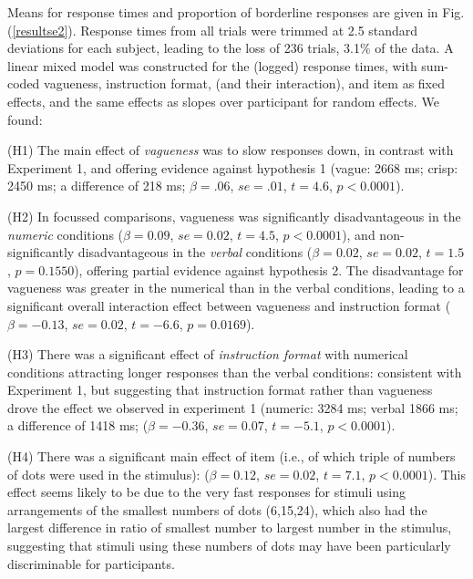 \documentclass[%
man,		%
floatsintext,%
apacite%
]{apa6}
\begin{document}
Means for response times and proportion of borderline responses are given in Fig. (\ref{resultse2}). 
Response times from all trials were trimmed at 2.5 standard deviations for each subject, leading to the loss of 236 trials, 3.1\% of the data. 
A linear mixed model was constructed for the (logged) response times, 
with sum-coded vagueness, instruction format, (and their interaction), and item as fixed effects, and the same effects as slopes over participant for random effects. We found:
{\small
\begin{APAenumerate}
	\item [(H1)] The main effect of \emph{vagueness} was to slow responses down, in contrast with Experiment 1, and offering evidence against hypothesis 1 (vague: 2668 ms; crisp: 2450 ms; a difference of 218 ms; $\beta=.06$, $se=.01$, $t=4.6$, $p<0.0001$). 
	\item [(H2)] In focussed comparisons, vagueness was significantly disadvantageous in the \emph{numeric} conditions ($\beta=0.09$, $se=0.02$, $t=4.5$, $p<0.0001$), and non-significantly disadvantageous in the \emph{verbal} conditions ($\beta=0.02$, $se=0.02$, $t=1.5$, $p=0.1550$), offering partial evidence against hypothesis 2. The disadvantage for vagueness was greater in the numerical than in the verbal conditions, leading to a significant overall interaction effect between vagueness and instruction format ($\beta=-0.13$, $se=0.02$, $t=-6.6$, $p=0.0169$).
	\item [(H3)] There was a significant effect of \emph{instruction format} with numerical conditions attracting longer responses than the verbal conditions: consistent with Experiment 1, but suggesting that instruction format rather than vagueness drove the effect we observed in experiment 1 (numeric: 3284 ms; verbal 1866 ms; a difference of 1418 ms; ($\beta=-0.36$, $se=0.07$, $t=-5.1$, $p<0.0001$).
	\item [(H4)] There was a significant main effect of item (i.e., of which triple of numbers of dots were used in the stimulus): ($\beta=0.12$, $se=0.02$, $t=7.1$, $p<0.0001$). This effect seems likely to be due to the very fast responses for stimuli using arrangements of the smallest numbers of dots (6,15,24), which also had the largest difference in ratio of smallest number to largest number in the stimulus, suggesting that stimuli using these numbers of dots may have been particularly discriminable for participants.
\end{APAenumerate}
}
\end{document}
